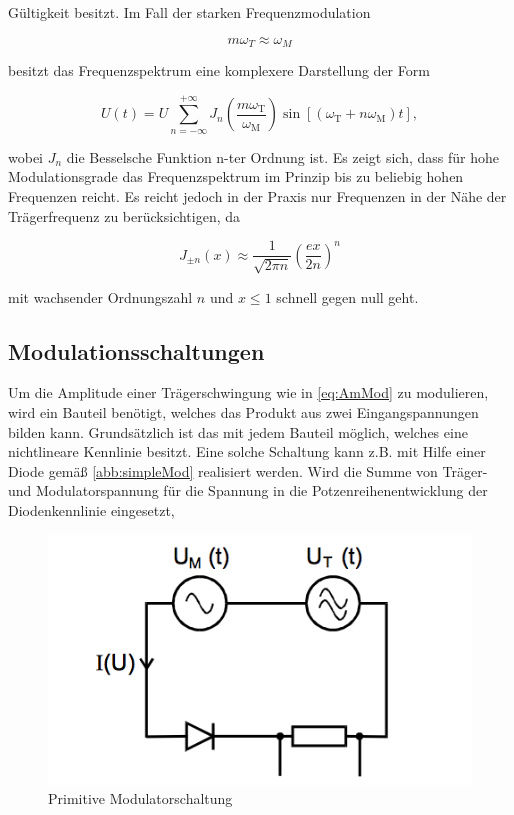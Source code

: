 \noindent Gültigkeit besitzt. Im Fall der starken Frequenzmodulation

\begin{equation}
m\omega_T \approx \omega_M
\end{equation}

\noindent besitzt das Frequenzspektrum eine komplexere Darstellung der Form

\begin{equation}
U(t) = U \sum_{n=-\infty}^{+\infty} J_{n}\left(\frac{m\omega_\text{T}}{\omega_\text{M}}\right)\sin\left[(\omega_\text{T} + n\omega_\text{M})t\right],
\end{equation}

\noindent wobei $J_n$ die Besselsche Funktion n-ter Ordnung ist. Es zeigt sich, dass für hohe Modulationsgrade das Frequenzspektrum im Prinzip bis zu beliebig hohen Frequenzen reicht. Es reicht jedoch in der Praxis nur Frequenzen in der Nähe der Trägerfrequenz zu berücksichtigen, da

\begin{equation}
J_{\pm n}(x) \approx \frac{1}{\sqrt{2\pi n}}\left(\frac{ex}{2n}\right)^n
\end{equation}

\noindent mit wachsender Ordnungszahl $n$ und $x \leq 1$ schnell gegen null geht.

\FloatBarrier

\subsection{Modulationsschaltungen}
Um die Amplitude einer Trägerschwingung wie in \autoref{eq:AmMod} zu modulieren, wird ein Bauteil benötigt, welches das Produkt aus zwei Eingangspannungen bilden kann. Grundsätzlich ist das mit jedem Bauteil möglich, welches eine nichtlineare Kennlinie besitzt.
Eine solche Schaltung kann z.B. mit Hilfe einer Diode gemäß \autoref{abb:simpleMod} realisiert werden. Wird die Summe von Träger- und Modulatorspannung für die Spannung in die Potzenreihenentwicklung der Diodenkennlinie eingesetzt,

\begin{figure}
	\centering
	\includegraphics[width=\textwidth]{img/Abb4.png}
	\caption{Primitive Modulatorschaltung \cite{FP}}
	\label{abb:simpleMod}
\end{figure}

